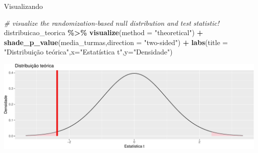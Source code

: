 \documentclass[
  9pt,
  ignorenonframetext,
  aspectratio=169]{beamer}
\newenvironment{Shaded}{\begin{snugshade}}{\end{snugshade}}
\newcommand{\CommentTok}[1]{\textcolor[rgb]{0.56,0.35,0.01}{\textit{#1}}}
\newcommand{\DataTypeTok}[1]{\textcolor[rgb]{0.13,0.29,0.53}{#1}}
\newcommand{\KeywordTok}[1]{\textcolor[rgb]{0.13,0.29,0.53}{\textbf{#1}}}
\newcommand{\NormalTok}[1]{#1}
\newcommand{\OperatorTok}[1]{\textcolor[rgb]{0.81,0.36,0.00}{\textbf{#1}}}
\newcommand{\StringTok}[1]{\textcolor[rgb]{0.31,0.60,0.02}{#1}}
\begin{document}
\begin{frame}[fragile]{Visualizando}
\protect\hypertarget{visualizando}{}
\begin{Shaded}
\begin{Highlighting}[]
\CommentTok{\# visualize the randomization{-}based null distribution and test statistic!}
\NormalTok{distribuicao\_teorica }\OperatorTok{\%\textgreater{}\%}
\StringTok{  }\KeywordTok{visualize}\NormalTok{(}\DataTypeTok{method =} \StringTok{"theoretical"}\NormalTok{) }\OperatorTok{+}\StringTok{ }
\StringTok{  }\KeywordTok{shade\_p\_value}\NormalTok{(media\_turmas,}\DataTypeTok{direction =} \StringTok{"two{-}sided"}\NormalTok{) }\OperatorTok{+}\StringTok{ }
\StringTok{  }\KeywordTok{labs}\NormalTok{(}\DataTypeTok{title =} \StringTok{"Distribuição teórica"}\NormalTok{,}\DataTypeTok{x=}\StringTok{"Estatística t"}\NormalTok{,}\DataTypeTok{y=}\StringTok{"Densidade"}\NormalTok{)}
\end{Highlighting}
\end{Shaded}

\includegraphics{aula_11_files/figure-beamer/unnamed-chunk-7-1.pdf}
\end{frame}
\end{document}
